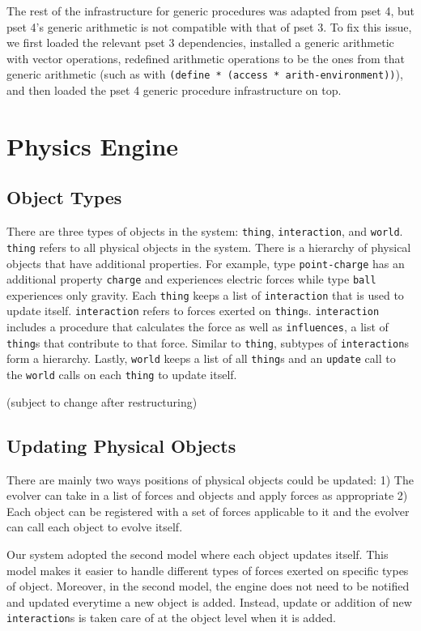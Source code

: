 \documentclass{article}
\begin{document}
The rest of the infrastructure for generic procedures was adapted from pset 4,
but pset 4's generic arithmetic is not compatible with that of pset 3. To fix
this issue, we first loaded the relevant pset 3 dependencies, installed a
generic arithmetic with vector operations, redefined arithmetic operations to
be the ones from that generic arithmetic (such as with \texttt{(define *
(access * arith-environment))}), and then loaded the pset 4 generic procedure
infrastructure on top.

\section{Physics Engine}
\subsection{Object Types}

There are three types of objects in the system: \texttt{thing}, \texttt{interaction}, and \texttt{world}. \texttt{thing} refers to all physical objects in the system. There is a hierarchy of physical objects that have additional properties. For example, type \texttt{point-charge} has an additional property \texttt{charge} and experiences electric forces while type \texttt{ball} experiences only gravity. Each \texttt{thing} keeps a list of \texttt{interaction} that is used to update itself. \texttt{interaction} refers to forces exerted on \texttt{thing}s. \texttt{interaction} includes a procedure that calculates the force as well as \texttt{influences}, a list of \texttt{thing}s that contribute to that force. Similar to \texttt{thing}, subtypes of \texttt{interaction}s form a hierarchy. Lastly, \texttt{world} keeps a list of all \texttt{thing}s and an \texttt{update} call to the \texttt{world} calls on each \texttt{thing} to update itself.

(subject to change after restructuring)

\subsection{Updating Physical Objects}

There are mainly two ways positions of physical objects could be updated: 1)
The evolver can take in a list of forces and objects and apply forces as
appropriate 2) Each object can be registered with a set of forces applicable to
it and the evolver can call each object to evolve itself.

Our system adopted the second model where each object updates itself. This
model makes it easier to handle different types of forces exerted on specific
types of object. Moreover, in the second model, the engine does not need to be
notified and updated everytime a new object is added. Instead, update or
addition of new \texttt{interaction}s is taken care of at the object level when
it is added.
\end{document}
